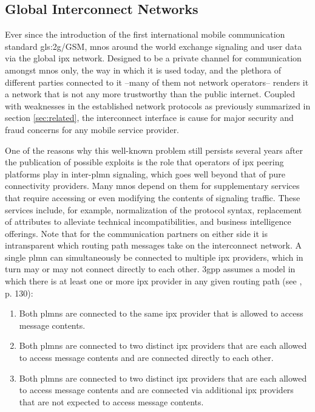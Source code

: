 \subsection{Global Interconnect Networks}

Ever since the introduction of the first international mobile communication standard \gls{gls:2g}/GSM, \glspl{mno} around the world exchange signaling and user data via the global \gls{ipx} network.
Designed to be a private channel for communication amongst \glspl{mno} only, the way in which it is used today, and the plethora of different parties connected to it --many of them not network operators-- renders it a network that is not any more trustworthy than the public internet.
Coupled with weaknesses in the established network protocols as previously summarized in section \ref{sec:related}, the interconnect interface is cause for major security and fraud concerns for any mobile service provider.

One of the reasons why this well-known problem still persists several years after the publication of possible exploits is the role that operators of \gls{ipx} peering platforms play in inter-\gls{plmn} signaling, which goes well beyond that of pure connectivity providers.
Many \glspl{mno} depend on them for supplementary services that require accessing or even modifying the contents of signaling traffic.
These services include, for example, normalization of the protocol syntax, replacement of attributes to alleviate technical incompatibilities, and business intelligence offerings.
Note that for the communication partners on either side it is intransparent which routing path messages take on the interconnect network.
A single \gls{plmn} can simultaneously be connected to multiple \gls{ipx} providers, which in turn may or may not connect directly to each other.
\gls{3gpp} assumes a model in which there is at least one or more \gls{ipx} provider in any given routing path (see \cite{3gpp.33.501}, p. 130):

\begin{enumerate}[label=--]
    \item Both \glspl{plmn} are connected to the same \gls{ipx} provider that is allowed to access message contents.

    \item Both \glspl{plmn} are connected to two distinct \gls{ipx} providers that are each allowed to access message contents and are connected directly to each other.

    \item Both \glspl{plmn} are connected to two distinct \gls{ipx} providers that are each allowed to access message contents and are connected via additional \gls{ipx} providers that are not expected to access message contents.
\end{enumerate}


